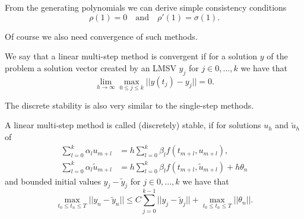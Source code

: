 	From the generating polynomials we can derive simple consistency conditions
	\begin{displaymath}
		\rho(1) = 0 \quad \text{and} \quad \rho'(1) = \sigma(1).
	\end{displaymath}

	Of course we also need convergence of such methods.
	
	\begin{definition} \label{def: LMSV convergence}
		We say that a linear multi-step method is convergent if for a solution $y$ of the problem a solution vector created by an LMSV $y_j$ for $j \in {0,...,k}$ we have that
		\begin{displaymath}
			\lim\limits_{h \to \infty} \max_{0 \leq j \leq k} ||y(t_j) - y_j|| = 0.
		\end{displaymath}
	\end{definition}
	
	
	The discrete stability is also very similar to the single-step methods.
	\begin{definition} \label{discrete stability LMSM}
		A linear multi-step method is called (discretely) stable, if for solutions $u_h$ and $\tilde{u}_h$ of
		\begin{align}
			\sum_{l=0}^{k} \alpha_l u_{m+l} &= h \sum_{l=0}^{k} \beta_l f(t_{m+l}, u_{m+l}), \\
			\sum_{l=0}^{k} \alpha_l \tilde{u}_{m+l} &= h \sum_{l=0}^{k} \beta_l f(t_{m+l}, \tilde{u}_{m+l}) + h\theta_n
		\end{align} 
		and bounded initial values $y_j - \tilde{y}_j$ for $j \in {0,...,k}$ we have that
		\begin{displaymath}
			\max_{t_0 \leq t_n \leq T} ||y_n - \tilde{y}_n|| \leq C \sum_{j=0}^{k-1} ||y_j - \tilde{y}_j|| + \max_{t_0 \leq t_n \leq T} ||\theta_n||.
		\end{displaymath}
	\end{definition}
	
	
